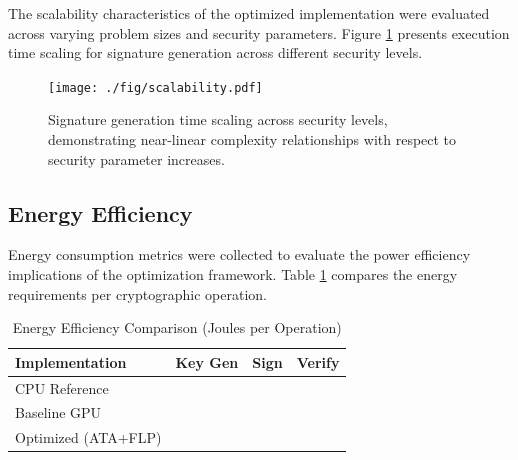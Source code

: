\documentclass[journal]{IEEEtran}
\begin{document}
The scalability characteristics of the optimized implementation were evaluated across varying problem sizes and security parameters. Figure \ref{fig:scalability} presents execution time scaling for signature generation across different security levels.

\begin{figure}[htbp]
  \centering
  \texttt{[image: ./fig/scalability.pdf]}
  \caption{Signature generation time scaling across security levels, demonstrating near-linear complexity relationships with respect to security parameter increases.}
  \label{fig:scalability}
\end{figure}


\subsection{Energy Efficiency}

Energy consumption metrics were collected to evaluate the power efficiency implications of the optimization framework. Table \ref{tab:energy_efficiency} compares the energy requirements per cryptographic operation.

\begin{table}[h]
\centering
\caption{Energy Efficiency Comparison (Joules per Operation)}
\label{tab:energy_efficiency}
\begin{tabular}{@{}lccc@{}}
\toprule
\textbf{Implementation} & \textbf{Key Gen} & \textbf{Sign} & \textbf{Verify} \\
\midrule
CPU Reference & & & \\
Baseline GPU & & & \\
Optimized (ATA+FLP) & & & \\
\bottomrule
\end{tabular}
\end{table}

\end{document}
